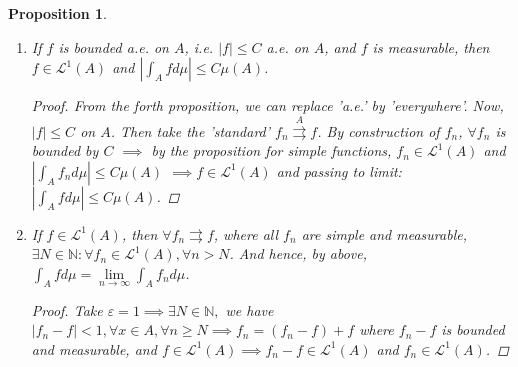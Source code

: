 \documentclass[12pt]{article}
\theoremstyle{blueplain}
\newtheorem{proposition}[theorem]{Proposition}
\theoremstyle{bluedef}
\theoremstyle{blueremark}
\newcommand{\N}{\mathbb{N}}
\newcommand{\eps}{\varepsilon}
\numberwithin{equation}{section}
\begin{document}
\begin{proposition}
\begin{enumerate}
          As a corollary, if $f,g$ are measurable on $A$ and $f = g$ a.e. on $A$, then $f,g$ are Lebesgue integrable or not Lebesgue integrable simultaneously, and if they are Lebesgue integrable, $\int_A f d\mu = \int_A g d\mu$.

          (So, 'Lebesgue integrable' ignores measure-zero sets.)
          \begin{proof}
            Let $f = 0$ a.e. on $A$. Choose the 'standard' $f_n \overset{A}{\rightrightarrows} f$. By construction, $\forall f_n$, which is a simple function, $f_n = 0$ a.e. on $A$.

            $\implies f_n \in \mathcal{L}^1(A)$ by definition and $\int_A f_n d\mu = 0$ $\implies f \in \mathcal{L}^1(A)$ and $\int_A f d\mu = 0$.

            If we have $f,g$ are measurable on $A$ and $f = g$ a.e. on $A$.

            $\implies f-g = 0$ a.e. on $A$. Consider $f = (f-g) +g$ and $g = (g-f) +f$, which help us check the Lebesgue integrability on both sides (If $f$ is Lebesgue integrable, then $g = (g-f) +f$ is also Lebesgue integrable. Coversely, if $g$ is Lebesgue integrable, then $f = (f-g) +g$ is also Lebesgue integrable.). Now the second proposition and the conclusion above give what we need.
          \end{proof}

    \item If $f$ is bounded a.e. on $A$, i.e. $|f| \leq C$ a.e. on $A$, and $f$ is measurable, then $f \in \mathcal{L}^1(A)$ and $|\int_A f d\mu| \leq C \mu(A)$.
          \begin{proof}
            From the forth proposition, we can replace 'a.e.' by 'everywhere'. Now, $|f| \leq C$ on $A$. Then take the 'standard'  $f_n \overset{A}{\rightrightarrows} f$. By construction of $f_n$, $\forall f_n$ is bounded by $C$ $\implies$ by the proposition for simple functions, $f_n \in \mathcal{L}^1(A)$ and $|\int_A f_n d\mu| \leq C \mu(A)$ $\implies f \in \mathcal{L}^1(A)$ and passing to limit: $|\int_A f d\mu| \leq C \mu(A)$.
          \end{proof}

    \item If $f \in \mathcal{L}^1(A)$, then $\forall f_n \rightrightarrows f$, where all $f_n$ are simple and measurable, $\exists N \in \N: \forall f_n \in \mathcal{L}^1(A), \forall n > N$. And hence, by above, $\int_A f d\mu = \lim\limits_{n \to \infty} \int_A f_n d\mu$.
          \begin{proof}
            Take $\eps = 1 \implies \exists N \in \N,$ we have $|f_n - f| < 1, \forall x \in A, \forall n \geq N \implies f_n = (f_n - f) + f$ where $f_n - f$ is bounded and measurable, and $f \in \mathcal{L}^1(A) \implies f_n - f \in \mathcal{L}^1(A)$ and $f_n \in \mathcal{L}^1(A)$.
          \end{proof}


\end{enumerate}
\end{proposition}
\end{document}
